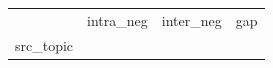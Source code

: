 \begin{tabular}{lrrr}
\toprule
 & intra_neg & inter_neg & gap \\
src_topic &  &  &  \\
\midrule
\bottomrule
\end{tabular}
